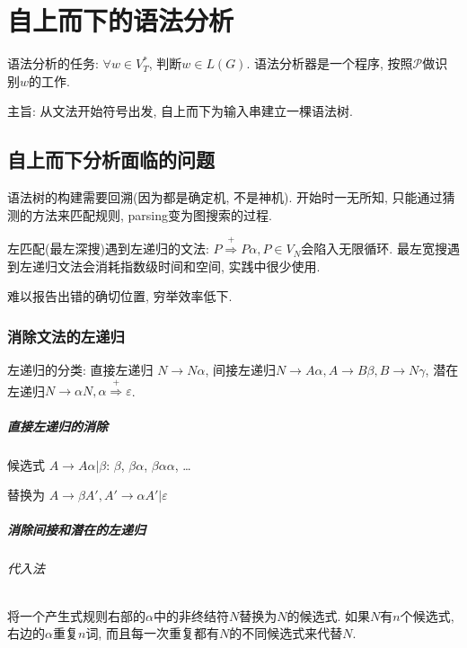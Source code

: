 \chapter{自上而下的语法分析}

    语法分析的任务: $\forall w\in V_T^*$, 判断$w\in L(G)$. 语法分析器是一个程序, 按照$\mathcal{P}$做识别$w$的工作.

    主旨: 从文法开始符号出发, 自上而下为输入串建立一棵语法树. 

    \section{自上而下分析面临的问题}

        语法树的构建需要回溯(因为都是确定机, 不是神机). 开始时一无所知, 只能通过猜测的方法来匹配规则, parsing变为图搜索的过程.

        左匹配(最左深搜)遇到\textsf{左递归}的文法: $P\stackrel{+}{\Rightarrow}P\alpha, P\in V_N$会陷入无限循环. 最左宽搜遇到左递归文法会消耗指数级时间和空间, 实践中很少使用.

        难以报告出错的确切位置, 穷举效率低下.

        \subsection{消除文法的左递归}
        
            \textsf{左递归}的分类: 直接左递归 $N\to N\alpha$, 间接左递归$N\to A\alpha, A\to B\beta, B\to N\gamma$, 潜在左递归$N\to\alpha N, \alpha\stackrel{+}{\Rightarrow}\varepsilon$.

            \paragraph{直接左递归的消除}

                候选式 $A\to A\alpha|\beta$: $\beta$, $\beta\alpha$, $\beta\alpha\alpha$, \ldots

                替换为 $A\to\beta A', A'\to\alpha A'|\varepsilon$

            \paragraph{消除间接和潜在的左递归}

                \subparagraph{代入法}

                    将一个产生式规则右部的$\alpha$中的非终结符$N$替换为$N$的候选式. 如果$N$有$n$个候选式, 右边的$\alpha$重复$n$词, 而且每一次重复都有$N$的不同候选式来代替$N$.

